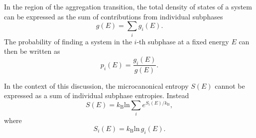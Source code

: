 \documentclass[12pt]{report}
\begin{document}
In the region of the aggregation transition, the total density of states of a system can be expressed as the sum of contributions from individual subphases
%
\begin{equation}
g(E) = \sum_{i} g_{i}(E).
\label{eq:densOfStates}
\end{equation}
%
The probability of finding a system in the $i$-th subphase at a fixed energy $E$ can then be written as
%
\begin{equation}
p_{i}(E) = \frac{g_{i}(E)}{g(E)}.
\label{eq:multProb}
\end{equation}
%

\newpage
\noindent
%
In the context of this discussion, the microcanonical entropy $S(E)$ cannot be expressed as a sum of individual subphase entropies. Instead
%
\begin{equation}
S(E) = k_{\mathrm{B}}\mathrm{ln}\sum_{i}e^{S_{i}(E)/k_{\mathrm{B}}},
\label{eq:micEntropy}
\end{equation}
%
where 
%
\begin{equation}
S_{i}(E) = k_{\mathrm{B}}\mathrm{ln}\, g_{i}(E).
\end{equation}
%
\end{document}
